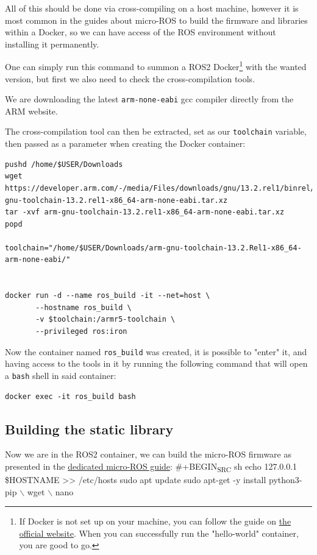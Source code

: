 \documentclass[10pt]{article}
\begin{document}
All of this should be done via cross-compiling on a host machine, however
it is most common in the guides about micro-ROS to build the firmware and libraries within a Docker,
so we can have access of the ROS environment without installing it permanently.

One can simply run this command to summon a ROS2 Docker\footnote{If Docker is not set up on your machine, you can follow the guide on \href{https://docs.docker.com/engine/install/ubuntu/}{the official website}.
When you can successfully run the "hello-world" container, you are good to go.} with the wanted version,
but first we also need to check the cross-compilation tools.

We are downloading the latest \texttt{arm-none-eabi} gcc compiler directly from the ARM website.

The cross-compilation tool can then be extracted, set as our \texttt{toolchain} variable,
then passed as a parameter when creating the Docker container:
\begin{verbatim}
pushd /home/$USER/Downloads
wget https://developer.arm.com/-/media/Files/downloads/gnu/13.2.rel1/binrel/arm-gnu-toolchain-13.2.rel1-x86_64-arm-none-eabi.tar.xz
tar -xvf arm-gnu-toolchain-13.2.rel1-x86_64-arm-none-eabi.tar.xz
popd

toolchain="/home/$USER/Downloads/arm-gnu-toolchain-13.2.Rel1-x86_64-arm-none-eabi/"


docker run -d --name ros_build -it --net=host \
       --hostname ros_build \
       -v $toolchain:/armr5-toolchain \
       --privileged ros:iron
\end{verbatim}

Now the container named \texttt{ros\_build} was created, it is possible to "enter" it, and having access
to the tools in it by running the following command that will open a \texttt{bash} shell in said container:
\begin{verbatim}
docker exec -it ros_build bash
\end{verbatim}

\subsection{Building the static library}
\label{sec:orgfc77110}
Now we are in the ROS2 container, we can build the micro-ROS firmware as presented
in the \href{https://micro.ros.org/docs/tutorials/advanced/create\\\_custom\\\_static\\\_library}{dedicated micro-ROS guide}:
\#+BEGIN\textsubscript{SRC} sh
echo 127.0.0.1 \$HOSTNAME >> /etc/hosts
sudo apt update 
sudo apt-get -y install python3-pip $\backslash$
     wget $\backslash$
     nano
\end{document}
